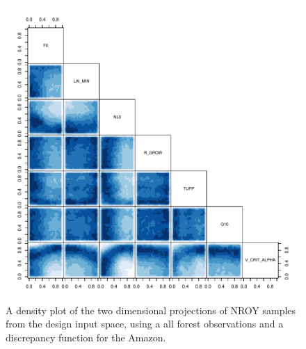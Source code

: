\documentclass[esd, manuscript]{copernicus}
\begin{document}
\begin{figure}[t]
\includegraphics[width=12cm]{graphics/plausible_disc_input_space.pdf}
\caption{A density plot of the two dimensional projections of NROY samples from the design input space, using a all forest observations and a discrepancy function for the Amazon.}
\label{fig:plausible_disc_input_space}
\end{figure}





\end{document}
